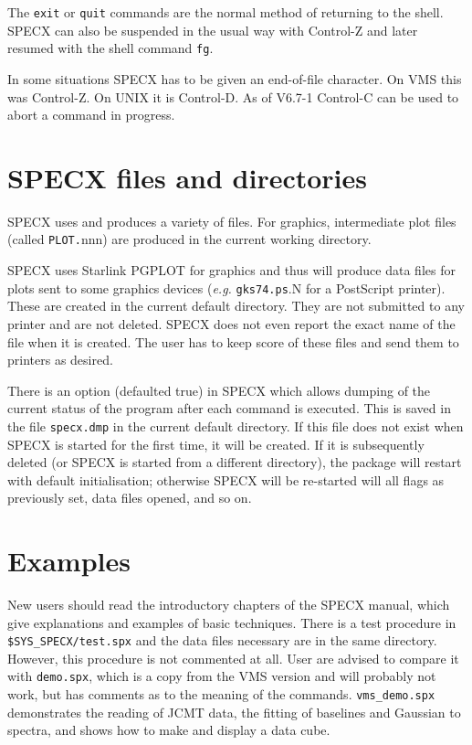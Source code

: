 \documentclass[twoside,11pt,nolof]{starlink}
\begin{document}
The \texttt{exit} or \texttt{quit} commands are the normal method of returning to
the shell.  SPECX can also be suspended in the usual way with Control-Z and
later resumed with the shell command \texttt{fg}.

In some situations SPECX has to be given an end-of-file character. On
VMS this was Control-Z. On UNIX it is Control-D. As of V6.7-1 Control-C
can be used to abort a command in progress.


\section {SPECX files and directories}

SPECX uses and produces a variety of files. For graphics,
intermediate plot files (called \texttt{PLOT.}nnn) are produced in the
current working directory.

SPECX uses Starlink PGPLOT for graphics and thus will produce data files for
plots sent to some graphics devices (\emph{e.g.} \texttt{gks74.ps}.N for a
PostScript printer). These are created in the current default directory. They
are not submitted to any printer and are not deleted. SPECX does not even
report the exact name of the file when it is created. The user has to keep
score of these files and send them to printers as desired.

There is an option (defaulted true) in SPECX which allows dumping of the
current status of the program after each command is executed. This is saved in
the file \texttt{specx.dmp} in the current default directory. If this file does
not exist when SPECX is started for the first time, it will be created. If it
is subsequently deleted (or SPECX is started from a different directory), the
package will restart with default initialisation; otherwise SPECX will be
re-started will all flags as previously set, data files opened, and so on.


\section {Examples}

New users should read the introductory chapters of the SPECX manual,
which give explanations and examples of basic techniques. There is a
test procedure in \texttt{\$SYS\_SPECX/test.spx} and the data files
necessary are in the same directory. However, this procedure is not
commented at all. User are advised to compare it with \texttt{demo.spx},
which is a copy from the VMS version and will probably not work, but has
comments as to the meaning of the commands.
\texttt{vms\_demo.spx} demonstrates the reading of JCMT data,
the fitting of baselines and Gaussian to spectra, and shows how to make
and display a data cube.
\end{document}
